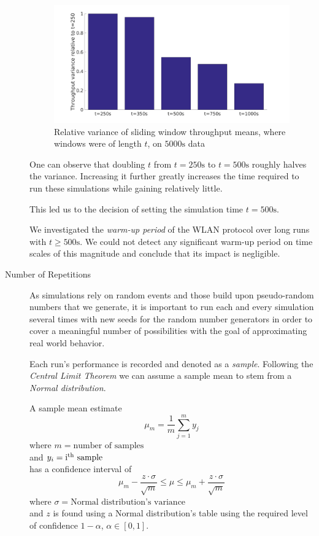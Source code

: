 \documentclass[a4paper]{scrreprt}
\begin{document}
\begin{description}
			\begin{figure}[H]
				\center\includegraphics[width=\textwidth]{../Get_Simulation_Parameters/relative_variance.png}
				\caption{Relative variance of sliding window throughput means, where windows were of length $t$, on $5000\text{s}$ data}
				\label{fig:relativevariance}
			\end{figure}
			
			One can observe that doubling $t$ from $t=250\text{s}$ to $t=500\text{s}$ roughly halves the variance. Increasing it further greatly increases the time required to run these simulations while gaining relatively little.
			
			This led us to the decision of setting the simulation time $t=500\text{s}$.
			
			We investigated the \emph{warm-up period} of the WLAN protocol over long runs with $t\geq 500\text{s}$. We could not detect any significant warm-up period on time scales of this magnitude and conclude that its impact is negligible. 
			
			\item[Number of Repetitions] As simulations rely on random events and those build upon pseudo-random numbers that we generate, it is important to run each and every simulation several times with new seeds for the random number generators in order to cover a meaningful number of possibilities with the goal of approximating real world behavior. 
			
			Each run's performance is recorded and denoted as a \emph{sample}. Following the \emph{Central Limit Theorem} we can assume a sample mean to stem from a \emph{Normal distribution}. 
			
			A sample mean estimate
			\[\mu_m=\frac{1}{m}\sum^m_{j=1}y_j\]
			where $m=\text{number of samples}$
			\\and $y_i=\text{i\textsuperscript{th} sample}$
			\\has a confidence interval of
			\[\mu_m-\frac{z\cdot \sigma}{\sqrt{m}}\leq \mu \leq \mu_m+\frac{z\cdot \sigma}{\sqrt{m}}\]
			where $\sigma=\text{Normal distribution's variance}$
			\\and $z$ is found using a Normal distribution's table using the required level of confidence $1-\alpha$, $\alpha\in [0,1]$.
			

\end{description}
\end{document}
